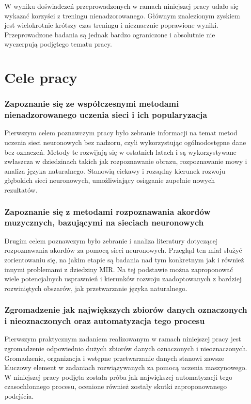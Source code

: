 W wyniku doświadczeń przeprowadzonych w ramach niniejszej pracy udało się wykazać korzyści z treningu nienadzorowanego. Głównym znalezionym zyskiem jest wielokrotnie krótszy czas treningu i nieznacznie poprawione wyniki. Przeprowadzone badania są jednak bardzo ograniczone i absolutnie nie wyczerpują podjętego tematu pracy.



\section{Cele pracy}

\subsubsection{Zapoznanie się ze współczesnymi metodami nienadzorowanego uczenia sieci i ich popularyzacja}

Pierwszym celem poznawczym pracy było zebranie informacji na temat metod uczenia sieci neuronowych bez nadzoru, czyli wykorzystując ogólnodostępne dane bez oznaczeń. Metody te rozwijają się w ostatnich latach i są wykorzystywane zwłaszcza w dziedzinach takich jak rozpoznawanie obrazu, rozpoznawanie mowy i analiza języka naturalnego. Stanowią ciekawy i rozsądny kierunek rozwoju głębokich sieci neuronowych, umożliwiający osiąganie zupełnie nowych rezultatów.

\subsubsection{Zapoznanie się z metodami rozpoznawania akordów muzycznych, bazującymi na sieciach neuronowych}

Drugim celem poznawczym było zebranie i analiza literatury dotyczącej rozpoznawania akordów za pomocą sieci neuronowych. Przegląd ten miał służyć zorientowaniu się, na jakim etapie są badania nad tym konkretnym jak i również innymi problemami z dziedziny MIR. Na tej podstawie można zaproponować wiele potencjalnych usprawnień i kierunków rozwoju zaadoptowanych z bardziej rozwiniętych obszarów, jak przetwarzanie języka naturalnego.

\subsubsection{Zgromadzenie jak największych zbiorów danych oznaczonych i nieoznaczonych oraz automatyzacja tego procesu}

Pierwszym praktycznym zadaniem realizowanym w ramach niniejszej pracy jest zgromadzenie odpowiednio dużych zbiorów danych oznaczonych i nieoznaczonych. Gromadzenie, organizacja i wstępne przetwarzanie danych stanowi zawsze kluczowy element w zadaniach rozwiązywanych za pomocą uczenia maszynowego. W niniejszej pracy podjęta została próba jak największej automatyzacji tego czasochłonnego procesu, ocenione również zostały skutki zaproponowanego podejścia.

